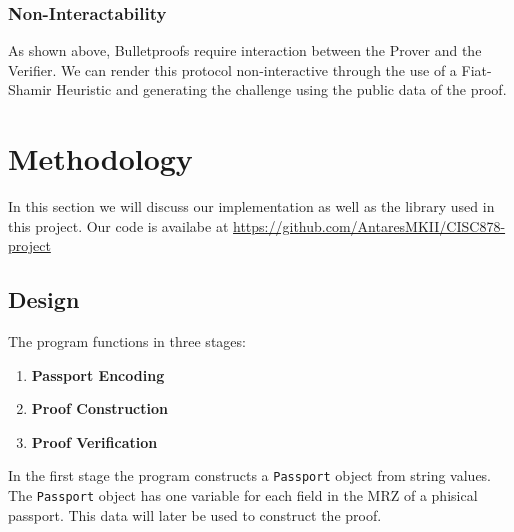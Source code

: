 \documentclass[sigconf,screen,nonacm]{acmart}
\begin{document}
  \subsubsection{Non-Interactability}

  As shown above, Bulletproofs require interaction between the Prover and the
  Verifier. We can render this protocol non-interactive through the use of a
  Fiat-Shamir Heuristic and generating the challenge using the public data of the
  proof.

  \section{Methodology}

  In this section we will discuss our implementation as well as the library used in
  this project. Our code is availabe at \url{https://github.com/AntaresMKII/CISC878-project}

  \subsection{Design}

  The program functions in three stages:
  \begin{enumerate}
    \item \textbf{Passport Encoding}
    \item \textbf{Proof Construction}
    \item \textbf{Proof Verification}
  \end{enumerate}

  In the first stage the program constructs a \texttt{Passport} object from
  string values. The \texttt{Passport} object has one variable for each field
  in the MRZ of a phisical passport. This data will later be used to construct the
  proof.
\end{document}
